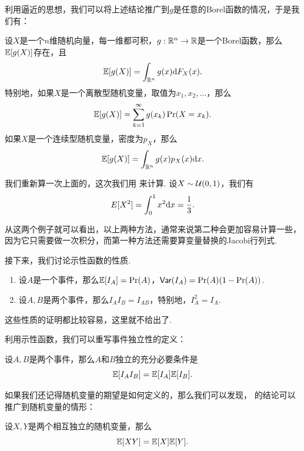 利用逼近的思想，我们可以将上述结论推广到$g$是任意的Borel函数的情况，于是我们有：

\begin{theorem}\label{theorem:expectation-function}
设$X$是一个$n$维随机向量，每一维都可积，$g:\mathbb{R}^n\to\mathbb{R}$是一个Borel函数，那么$\mathbb{E}[g(X)]$存在，且
\[\mathbb{E}[g(X)]=\int_{\mathbb{R}^n} g(x)\mathrm{d} F_X(x).\]
特别地，如果$X$是一个离散型随机变量，取值为$x_1,x_2,\dots$，那么
\[\mathbb{E}[g(X)]=\sum_{k=1}^\infty g(x_k)\Pr(X=x_k).\]
如果$X$是一个连续型随机变量，密度为$p_X$，那么
\[\mathbb{E}[g(X)]=\int_{\mathbb{R}^n} g(x)p_X(x)\mathrm{d} x.\]
\end{theorem}

\begin{example}
我们重新算一次上面的，这次我们用 来计算. 设$X\sim\mathcal{U}(0,1)$，我们有
\[E[X^2]=\int_0^1 x^2\mathrm{d} x=\frac{1}{3}.\]
\end{example}

从这两个例子就可以看出，以上两种方法，通常来说第二种会更加容易计算一些，因为它只需要做一次积分，而第一种方法还需要算变量替换的Jacobi行列式. 

接下来，我们讨论示性函数的性质. 

\begin{proposition}\label{proposition:expectation-indicator}
\begin{enumerate}
    \item 设$A$是一个事件，那么$\mathbb{E}[I_A]=\Pr(A)$，$\mathsf{Var}(I_A)=\Pr(A)(1-\Pr(A))$.
    \item 设$A,B$是两个事件，那么$I_AI_B=I_{AB}$，特别地，$I_A^2=I_A$.
\end{enumerate}
\end{proposition}
这些性质的证明都比较容易，这里就不给出了. 

利用示性函数，我们可以重写事件独立性的定义：

\begin{proposition}\label{proposition:independent-expectation}
设$A,B$是两个事件，那么$A$和$B$独立的充分必要条件是
\[\mathbb{E}[I_AI_B]=\mathbb{E}[I_A]\mathbb{E}[I_B].\]
\end{proposition}

如果我们还记得随机变量的期望是如何定义的，那么我们可以发现， 的结论可以推广到随机变量的情形：

\begin{theorem}\label{theorem:independent-expectation-2}
设$X,Y$是两个相互独立的随机变量，那么
\[\mathbb{E}[XY]=\mathbb{E}[X]\mathbb{E}[Y].\] 
\end{theorem}


